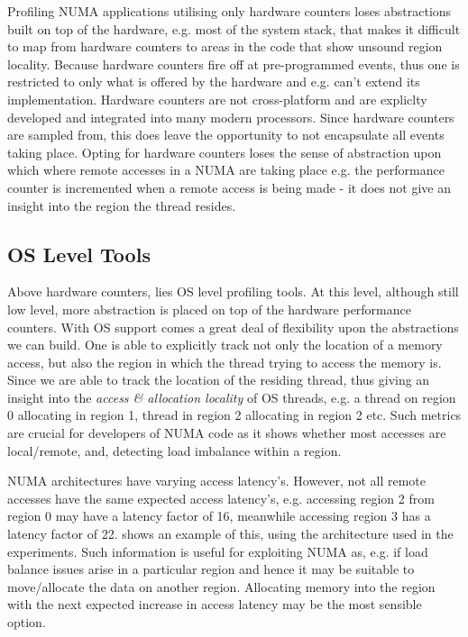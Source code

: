 \documentclass{paper}\usepackage{graphicx}
\begin{document}
Profiling NUMA applications utilising only hardware counters loses abstractions built on top of the hardware, e.g. most of the system stack, that makes it difficult to map from hardware counters to areas in the code that show unsound region locality. Because hardware counters fire off at pre-programmed events, thus one is restricted to only what is offered by the hardware and e.g. can't extend its implementation. Hardware counters are not cross-platform and are expliclty developed and integrated into many modern processors. Since hardware counters are sampled from, this does leave the opportunity to not encapsulate all events taking place. Opting for hardware counters loses the sense of abstraction upon which where remote accesses in a NUMA are taking place e.g. the performance counter is incremented when a remote access is being made - it does not give an insight into the region the thread resides. 

\subsection{OS Level Tools}
\label{sec:os_tools}

Above hardware counters, lies OS level profiling tools. At this level, although still low level, more abstraction is placed on top of the hardware performance counters. With OS support comes a great deal of flexibility upon the abstractions we can build. One is able to explicitly track not only the location of a memory access, but also the region in which the thread trying to access the memory is. Since we are able to track the location of the residing thread, thus giving an insight into the \textit{access \& allocation locality} of OS threads, e.g. a thread on region 0 allocating in region 1, thread in region 2 allocating in region 2 etc. Such metrics are crucial for developers of NUMA code as it shows whether most accesses are local/remote, and, detecting load imbalance within a region.

NUMA architectures have varying access latency's. However, not all remote accesses have the same expected access latency's, e.g. accessing region 2 from region 0 may have a latency factor of 16, meanwhile accessing region 3 has a latency factor of 22.  shows an example of this, using the architecture used in the experiments. Such information is useful for exploiting NUMA as, e.g. if load balance issues arise in a particular region and hence it may be suitable to move/allocate the data on another region. Allocating memory into the region with the next expected increase in access latency may be the most sensible option. 
\end{document}
